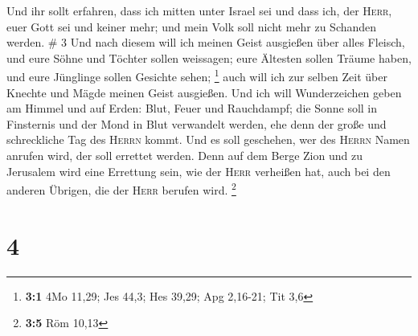  Und ihr sollt erfahren, dass ich mitten unter Israel sei
und dass ich, der \textsc{Herr}, euer Gott sei und keiner mehr; und mein
Volk soll nicht mehr zu Schanden werden. \# 3  Und nach
diesem will ich meinen Geist ausgießen über alles Fleisch, und eure
Söhne und Töchter sollen weissagen; eure Ältesten sollen Träume haben,
und eure Jünglinge sollen Gesichte sehen; \footnote{\textbf{3:1} 4Mo
  11,29; Jes 44,3; Hes 39,29; Apg 2,16-21; Tit 3,6}  auch
will ich zur selben Zeit über Knechte und Mägde meinen Geist ausgießen.
 Und ich will Wunderzeichen geben am Himmel und auf Erden:
Blut, Feuer und Rauchdampf;  die Sonne soll in Finsternis
und der Mond in Blut verwandelt werden, ehe denn der große und
schreckliche Tag des \textsc{Herrn} kommt.  Und es soll
geschehen, wer des \textsc{Herrn} Namen anrufen wird, der soll errettet
werden. Denn auf dem Berge Zion und zu Jerusalem wird eine Errettung
sein, wie der \textsc{Herr} verheißen hat, auch bei den anderen Übrigen,
die der \textsc{Herr} berufen wird. \footnote{\textbf{3:5} Röm 10,13}

\hypertarget{section-2}{%
\section{4}\label{section-2}}

